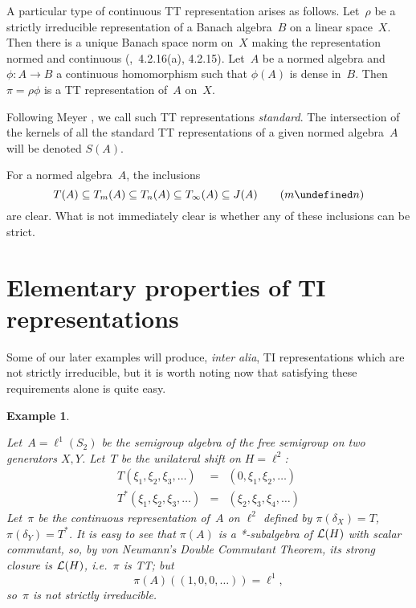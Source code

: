 \documentclass[11pt]{article}
\newcommand{\ie}{i.e.\ }
\newcommand{\sseq}{\subseteq}
\let\leq\undefined  \let\geq\undefined
\let\le\leq   \let\ge\geq
\newcommand{\e}{\varepsilon}
\newtheorem{example}[thm]{Example}
\newenvironment{Example}{\begin{example}\begin{rm}}{\end{rm}\end{example}}
\newcommand{\detail}[1]{}
\newcommand{\LH}{{\cal L}(H)}
\begin{document}
A particular type of continuous TT representation arises as follows.
Let~$\rho$ be a strictly irreducible representation of a Banach algebra~$B$ on a linear
space~$X$.   Then there is a unique Banach space norm on~$X$ making the
representation normed and continuous (\cite{Palmerbk},~4.2.16(a), 4.2.15).
Let~$A$ be a normed algebra and $\phi:A \to B$ a continuous homomorphism such
that $\phi(A)$ is dense in~$B$.  Then $\pi = \rho\phi$ is a TT representation
of~$A$ on~$X$.
\detail{For if $x_1,\dots,x_n,$ $y_1,\dots,y_n$ are in~$X$ with
$\{x_1,\dots,x_n\}$ linearly independent, then there exists $b \in B$ such that
$\rho(b)(x_i) = y_i$ $(1 \le i \le n)$.   Given $\e > 0$, we find $a \in A$ such
that $\|\phi(a) - b\| < \e/\max_i\|x_i\|$ and then $\|\pi(a)(x_i) - y_i\| < \e$.}
Following Meyer \cite{Meyer1}, we call such TT representations {\em standard}.
The intersection of the kernels of all the standard TT representations of a
given normed algebra~$A$ will be denoted $S(A)$.

For a normed algebra~$A$, the inclusions
$$T(A) \sseq T_m(A) \sseq T_n(A) \sseq T_\infty(A) \sseq J(A) \qquad (m \le n)$$
are clear.   What is not immediately clear is whether any of these inclusions
can be strict.

\section{Elementary properties of TI representations}\label{S3}

Some of our later examples will produce, {\em inter alia}, TI representations
which are not strictly irreducible, but it is worth noting now that
satisfying these requirements alone is quite easy.

\begin{Example}\label{Ex1}
Let~$A= \ell^1(S_2)$ be the semigroup algebra of the free semigroup on two
generators $X,Y$.    Let~$T$ be the unilateral shift on $H=\ell^2$:
\begin{eqnarray*}
T(\xi_1,\xi_2,\xi_3,\dots) & = & (0,\xi_1,\xi_2,\dots)\\
T^*(\xi_1,\xi_2,\xi_3,\dots) & = & (\xi_2,\xi_3,\xi_4,\dots)
\end{eqnarray*}
Let~$\pi$ be the continuous representation of~$A$ on $\ell^2$ defined by
$\pi(\delta_X) = T$, $\pi(\delta_Y) = T^*$.   It is easy to see that
$\pi(A)$ is a *-subalgebra of $\LH$ with scalar commutant, so, by von Neumann's
Double Commutant Theorem, its strong closure is $\LH$, \ie $\pi$ is TT; but
$$\pi(A)((1,0,0,\dots))  = \ell^1,$$ so~$\pi$ is not strictly irreducible.
\end{Example}
\end{document}

